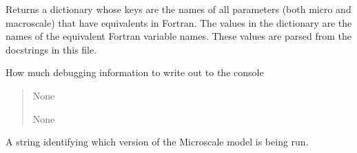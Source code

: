 \documentclass[letterpaper,10pt,english]{sphinxmanual}
\begin{document}
\begin{fulllineitems}

\begin{fulllineitems}
\label{\detokenize{lysis.util:lysis.util.parameters.MicroParameters.fortran_names}}
\pysigstartsignatures
{}
\pysigstopsignatures
\sphinxAtStartPar
Returns a dictionary whose keys are the names of all parameters (both micro\sphinxhyphen{} and macroscale)
that have equivalents in Fortran. The values in the dictionary are the names of the equivalent
Fortran variable names.
These values are parsed from the docstrings in this file.

\end{fulllineitems}


\begin{fulllineitems}
\label{\detokenize{lysis.util:lysis.util.parameters.MicroParameters.log_lvl}}
\pysigstartsignatures
{}
\pysigstopsignatures
\sphinxAtStartPar
How much debugging information to write out to the console
\begin{quote}\begin{description}
\sphinxAtStartPar
None

\sphinxAtStartPar
None

\end{description}\end{quote}

\end{fulllineitems}


\begin{fulllineitems}
\label{\detokenize{lysis.util:lysis.util.parameters.MicroParameters.micro_version}}
\pysigstartsignatures
{}
\pysigstopsignatures
\sphinxAtStartPar
A string identifying which version of the Microscale model is being run.


\end{fulllineitems}
\end{fulllineitems}
\end{document}
